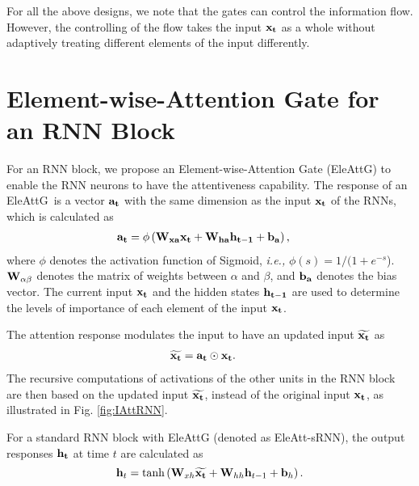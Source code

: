 \documentclass[runningheads]{llncs}
\newcommand{\Outer}{Element-wise}
\newcommand{\EleAttGn}{{EleAttG}}
\newcommand{\EleAttG}{{EleAttG~}}
\begin{document}
{	For all the above designs, we note that the gates can control the information flow. However, the controlling of the flow takes the input $\bf{x}_t$ as a whole without adaptively treating different elements of the input differently. 

	\section{\Outer-Attention Gate for an RNN Block}
	\label{sec:EleAtt-RNN}

	For an RNN block, we propose an \Outer-Attention Gate (\EleAttGn) to enable the RNN neurons to have the attentiveness capability. The response of an \EleAttG is a vector $\bf{a}_t$ with the same dimension as the input $\bf{x}_t$ of the RNNs, which is calculated as 
	\begin{eqnarray}
	\label{equ:agru}
	\begin{aligned}
	\!&\bf{a}_t =\phi \left({\bf{W}_{xa}}{\bf{x}_t} + {\bf{W}_{ha} {\bf{h}_{t-1}}} + {\bf{b}_a}  \right),
	\end{aligned}
	\end{eqnarray}
	where $\phi$ denotes the activation function of Sigmoid, {\it i.e.,} $\phi(s) = 1/(1+e^{-s}$). $\bf{W}_{\alpha\beta}$ denotes the matrix of weights between $\alpha$ and $\beta$, and $\bf{b}_a$ denotes the bias vector. The current input $\bf{x}_t$ and the hidden states $\bf{h}_{t-1}$ are used to determine the levels of importance of each element of the input $\bf{x}_t$.
	
	The attention response modulates the input to have an updated input $\widetilde{\bf{x}_t}$ as 
	\begin{eqnarray}
	\label{equ:updatedx}
	\begin{aligned}
	\!&\widetilde{\bf{x}_t}= \bf{a}_t \odot {\bf{x}_t}.
	\end{aligned}
	\end{eqnarray}
	The recursive computations of activations of the other units in the RNN block are then based on the updated input $\widetilde{\bf{x}_t}$, instead of the original input $\bf{x}_t$, as illustrated in Fig. \ref{fig:IAttRNN}.
	
	For a standard RNN block with EleAttG (denoted as EleAtt-sRNN), the output responses $\bf{h}_t$ at time $t$ are calculated as
	\begin{equation}
	\label{equ:EleAtt-rnn}
	{{\bf{h}}_{t}} = \tanh \left( {{\bf{W}}_{xh}}\widetilde{\bf{x}_t} + {{\bf{W}}_{hh}}{{\bf{h}}_{t-1} + {\bf{b}}_h} \right).
	\end{equation}
	
}
\end{document}
